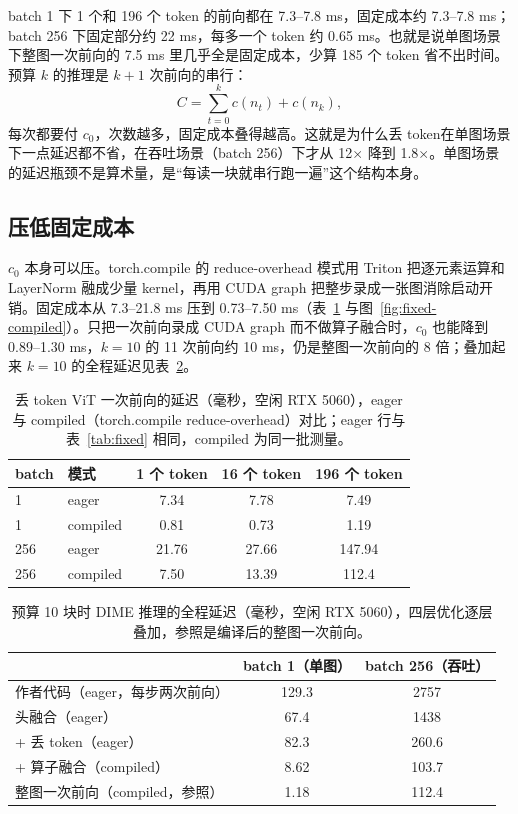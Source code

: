 \documentclass[11pt,a4paper,UTF8,fontset=none]{ctexart}
\newcommand{\dense}{整图一次前向}
\newcommand{\fused}{头融合}
\newcommand{\tokdrop}{丢 token}
\begin{document}
batch 1 下 1 个和 196 个 token 的前向都在 7.3--7.8 ms，固定成本约 7.3--7.8 ms；batch 256 下固定部分约 22 ms，每多一个 token 约 0.65 ms。也就是说单图场景下\dense 的 7.5 ms 里几乎全是固定成本，少算 185 个 token 省不出时间。预算 $k$ 的推理是 $k+1$ 次前向的串行：
\begin{equation}
C = \sum_{t=0}^{k} c(n_t) + c(n_k),
\end{equation}
每次都要付 $c_0$，次数越多，固定成本叠得越高。这就是为什么\tokdrop{}在单图场景下一点延迟都不省，在吞吐场景（batch 256）下才从 12$\times$ 降到 1.8$\times$。单图场景的延迟瓶颈不是算术量，是“每读一块就串行跑一遍”这个结构本身。

\subsection{压低固定成本}

$c_0$ 本身可以压。torch.compile 的 reduce-overhead 模式用 Triton 把逐元素运算和 LayerNorm 融成少量 kernel，再用 CUDA graph 把整步录成一张图消除启动开销。固定成本从 7.3--21.8 ms 压到 0.73--7.50 ms（表~\ref{tab:fixed-compiled} 与图~\ref{fig:fixed-compiled}）。只把一次前向录成 CUDA graph 而不做算子融合时，$c_0$ 也能降到 0.89--1.30 ms，$k=10$ 的 11 次前向约 10 ms，仍是\dense 的 8 倍；叠加起来 $k=10$ 的全程延迟见表~\ref{tab:stack}。

\begin{table}[H]
\centering
\caption{丢 token ViT 一次前向的延迟（毫秒，空闲 RTX 5060），eager 与 compiled（torch.compile reduce-overhead）对比；eager 行与表~\ref{tab:fixed} 相同，compiled 为同一批测量。}
\label{tab:fixed-compiled}
\small
\begin{tabular}{llccc}
\toprule
batch & 模式 & 1 个 token & 16 个 token & 196 个 token \\
\midrule
1 & eager & 7.34 & 7.78 & 7.49 \\
1 & compiled & 0.81 & 0.73 & 1.19 \\
256 & eager & 21.76 & 27.66 & 147.94 \\
256 & compiled & 7.50 & 13.39 & 112.4 \\
\bottomrule
\end{tabular}
\end{table}

\begin{table}[H]
\centering
\caption{预算 10 块时 DIME 推理的全程延迟（毫秒，空闲 RTX 5060），四层优化逐层叠加，参照是编译后的\dense。}
\label{tab:stack}
\small
\begin{tabular}{lcc}
\toprule
 & batch 1（单图） & batch 256（吞吐） \\
\midrule
作者代码（eager，每步两次前向） & 129.3 & 2757 \\
\fused（eager） & 67.4 & 1438 \\
+ \tokdrop{}（eager） & 82.3 & 260.6 \\
+ 算子融合（compiled） & 8.62 & 103.7 \\
\dense（compiled，参照） & 1.18 & 112.4 \\
\bottomrule
\end{tabular}
\end{table}
\end{document}
